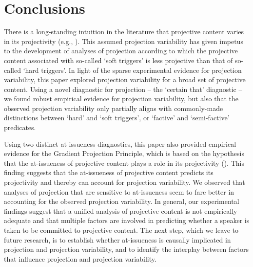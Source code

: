 \documentclass[11pt,fleqn]{article}
\newcommand{\6}{\mbox{$[\hspace*{-.6mm}[$}}
\newcommand{\9}{\mbox{$]\hspace*{-.6mm}]$}}
\begin{document}
\section{Conclusions}\label{s6}

There is a long-standing intuition in the literature that projective content varies in its projectivity (e.g., \citealt{karttunen71b,simons01,abusch10}). This assumed projection variability has given impetus to the development of analyses of projection according to which the projective content associated with so-called `soft triggers' is less projective than that of so-called `hard triggers'. In light of the sparse experimental evidence for projection variability, this paper explored projection variability for a broad set of projective content. Using a novel diagnostic for projection -- the `certain that' diagnostic -- we found robust empirical evidence for projection variability, but also that the observed projection variability only partially aligns with commonly-made distinctions between `hard' and `soft triggers', or `factive' and `semi-factive' predicates. 

Using two distinct at-issueness diagnostics, this paper also provided empirical evidence for the Gradient Projection Principle, which is based on the hypothesis that the at-issueness of projective content plays a role in its projectivity (\citealt{brst-salt10,brst-ar}). This finding suggests that the at-issueness of projective content predicts its projectivity and thereby can account for projection variability. We observed that analyses of projection that are sensitive to at-issueness seem to fare better in accounting for the observed projection variability. In general, our experimental findings suggest that a unified analysis of projective content is not empirically adequate and that multiple factors are involved in predicting whether a speaker is taken to be committed to projective content. The next step, which we leave to future research, is to establish whether at-issueness is causally implicated in projection and projection variability, and to identify the interplay between factors that influence projection and projection variability.

\appendix

\setcounter{table}{0}
\renewcommand{\thetable}{A\arabic{table}}

\setcounter{figure}{0}
\renewcommand{\thefigure}{A\arabic{figure}}
\end{document}
